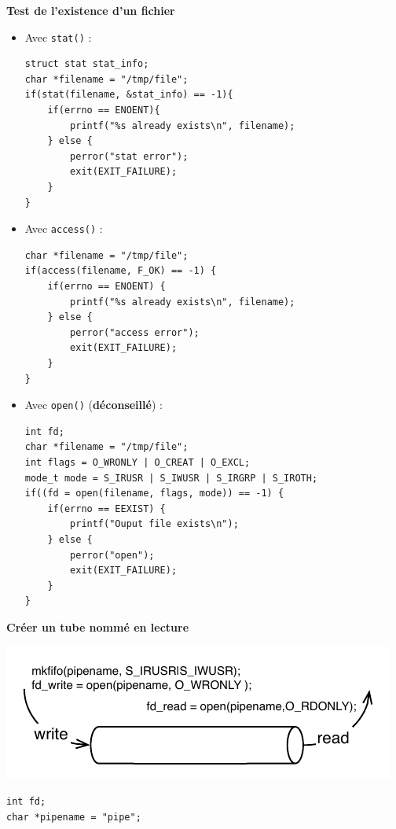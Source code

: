 \documentclass[french]{scrartcl}
\makeatletter
\newenvironment{BlockIndent}{\list{}%
    {\setlength{\leftmargin}{4mm}%
	 \setlength{\listparindent}{\parindent}%
     \setlength{\itemindent}{\listparindent}%
     \setlength{\topsep}{0pt}}%
     \item[]\relax}
{\endlist}
\newenvironment{figurehere}
  {\def\@captype{figure}}
  {}
\makeatother
\begin{document}
\begin{multicols}{3}
\columnbreak
\vskip 5pt
\textbf{Test de l'existence d'un fichier}\begin{itemize}
	\item Avec \lstinline!stat()! :
\vspace{-5pt}\begin{lstlisting}
struct stat stat_info;
char *filename = "/tmp/file";
if(stat(filename, &stat_info) == -1){
	if(errno == ENOENT){
		printf("%s already exists\n", filename);
	} else {
		perror("stat error");
		exit(EXIT_FAILURE);
	}
}
\end{lstlisting}\vspace{-5pt}
	\item Avec \lstinline!access()! :
\vspace{-5pt}\begin{lstlisting}
char *filename = "/tmp/file";
if(access(filename, F_OK) == -1) {
	if(errno == ENOENT) {
		printf("%s already exists\n", filename);
	} else {
		perror("access error");
		exit(EXIT_FAILURE);
	}
}
\end{lstlisting}\vspace{-5pt}
	\item Avec \lstinline!open()! (\textbf{déconseillé}) :
	\vspace{-5pt}\begin{lstlisting}
int fd;
char *filename = "/tmp/file";
int flags = O_WRONLY | O_CREAT | O_EXCL;
mode_t mode = S_IRUSR | S_IWUSR | S_IRGRP | S_IROTH;
if((fd = open(filename, flags, mode)) == -1) {
	if(errno == EEXIST) {
		printf("Ouput file exists\n");
	} else {
		perror("open");
		exit(EXIT_FAILURE);
	}
}
\end{lstlisting}\vspace{-5pt}
\end{itemize}

\vskip 5pt
\textbf{Créer un tube nommé en lecture}

\begin{figurehere}
    \includegraphics[scale=.75]{images/pipe-nomm}
\end{figurehere}
\begin{BlockIndent}
\vspace{-5pt}\begin{lstlisting}
int fd;
char *pipename = "pipe";


\end{lstlisting}
\end{BlockIndent}
\end{multicols}
\end{document}
